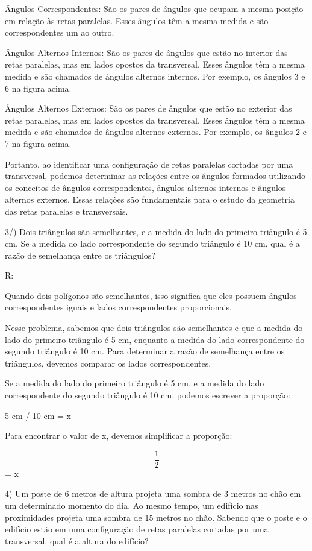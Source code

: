 Ângulos Correspondentes: São os pares de ângulos que ocupam a mesma
posição em relação às retas paralelas. Esses ângulos têm a mesma medida
e são correspondentes um ao outro.

Ângulos Alternos Internos: São os pares de ângulos que estão no interior
das retas paralelas, mas em lados opostos da transversal. Esses ângulos
têm a mesma medida e são chamados de ângulos alternos internos. Por
exemplo, os ângulos 3 e 6 na figura acima.

Ângulos Alternos Externos: São os pares de ângulos que estão no exterior
das retas paralelas, mas em lados opostos da transversal. Esses ângulos
têm a mesma medida e são chamados de ângulos alternos externos. Por
exemplo, os ângulos 2 e 7 na figura acima.

Portanto, ao identificar uma configuração de retas paralelas cortadas
por uma transversal, podemos determinar as relações entre os ângulos
formados utilizando os conceitos de ângulos correspondentes, ângulos
alternos internos e ângulos alternos externos. Essas relações são
fundamentais para o estudo da geometria das retas paralelas e
transversais.

3/) Dois triângulos são semelhantes, e a medida do lado do primeiro
triângulo é 5 cm. Se a medida do lado correspondente do segundo
triângulo é 10 cm, qual é a razão de semelhança entre os triângulos?

R:

Quando dois polígonos são semelhantes, isso significa que eles possuem
ângulos correspondentes iguais e lados correspondentes proporcionais.

Nesse problema, sabemos que dois triângulos são semelhantes e que a
medida do lado do primeiro triângulo é 5 cm, enquanto a medida do lado
correspondente do segundo triângulo é 10 cm. Para determinar a razão de
semelhança entre os triângulos, devemos comparar os lados
correspondentes.

Se a medida do lado do primeiro triângulo é 5 cm, e a medida do lado
correspondente do segundo triângulo é 10 cm, podemos escrever a
proporção:

5 cm / 10 cm = x

Para encontrar o valor de x, devemos simplificar a proporção:

\[\frac {1}{2}\] = x

4) Um poste de 6 metros de altura projeta uma sombra de 3 metros no chão
em um determinado momento do dia. Ao mesmo tempo, um edifício nas
proximidades projeta uma sombra de 15 metros no chão. Sabendo que o
poste e o edifício estão em uma configuração de retas paralelas cortadas
por uma transversal, qual é a altura do edifício?

